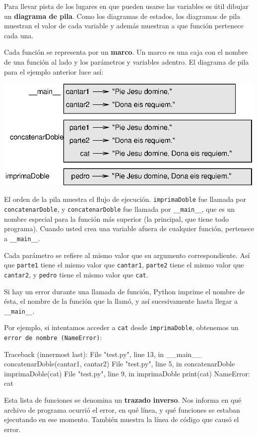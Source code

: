 \label{stackdiagram}  

Para llevar pista de los lugares en que pueden usarse las variables
es útil dibujar un \textbf{diagrama de pila}. Como los diagramas de
estados, los diagramas de pila muestran el valor de cada variable
y además muestran a que función pertenece cada una.

Cada función se representa por un \textbf{marco}. Un marco es una
caja con el nombre de una función al lado y los parámetros y variables
adentro. El diagrama de pila para el ejemplo anterior luce así:

 \beforefig \centerline{\includegraphics{illustrations/stack}}
\afterfig

El orden de la pila muestra el flujo de ejecución. \texttt{imprimaDoble}
fue llamada por \texttt{concatenarDoble}, y \texttt{concatenarDoble}
fue llamada por \texttt{\_\_main\_\_}, que es un nombre especial para
la función más superior (la principal, que tiene todo programa). Cuando
usted crea una variable afuera de cualquier función, pertenece a \texttt{\_\_main\_\_}.

Cada parámetro se refiere al mismo valor que su argumento correspondiente.
Así que \texttt{parte1} tiene el mismo valor que \texttt{cantar1},
\texttt{parte2} tiene el mismo valor que \texttt{cantar2}, y \texttt{pedro}
tiene el mismo valor que \texttt{cat}.

Si hay un error durante una llamada de función, Python imprime el
nombre de ésta, el nombre de la función que la llamó, y así sucesivamente
hasta llegar a \texttt{\_\_main\_\_}.

Por ejemplo, si intentamos acceder a \texttt{cat} desde \texttt{imprimaDoble},
obtenemos un \texttt{error de nombre (NameError)}:
\begin{pythoncode}
Traceback (innermost last):
  File "test.py", line 13, in __main__
    concatenarDoble(cantar1, cantar2)
  File "test.py", line 5, in concatenarDoble
    imprimaDoble(cat)
  File "test.py", line 9, in imprimaDoble
    print(cat)
NameError: cat
\end{pythoncode}
Esta lista de funciones se denomina un \textbf{trazado inverso}. Nos
informa en qué archivo de programa ocurrió el error, en qué línea,
y qué funciones se estaban ejecutando en ese momento. También muestra
la línea de código que causó el error.

